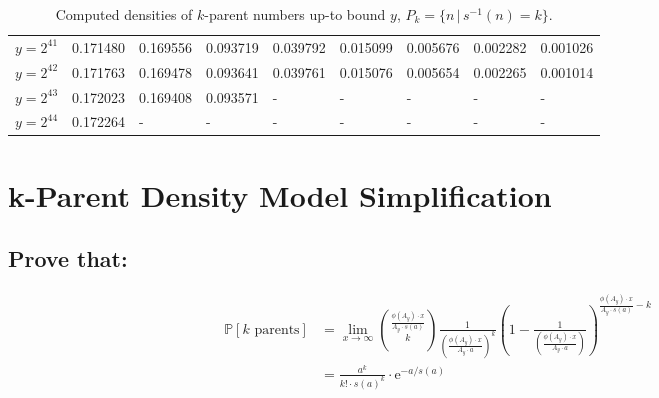\documentclass{article}
\theoremstyle{definition}
\begin{document}
\begin{table}[h!]
{\begin{tabular}{l|rrrrrrrr}
            $y = 2^{41}$             & 0.171480 & 0.169556              & 0.093719              & 0.039792              & 0.015099              & 0.005676              & 0.002282              & 0.001026              \\
            $y = 2^{42}$             & 0.171763 & 0.169478              & 0.093641              & 0.039761              & 0.015076              & 0.005654              & 0.002265              & 0.001014              \\
            $y = 2^{43}$             & 0.172023 & 0.169408              & 0.093571              & \multicolumn{1}{l}{-} & \multicolumn{1}{l}{-} & \multicolumn{1}{l}{-} & \multicolumn{1}{l}{-} & \multicolumn{1}{l}{-} \\
            $y = 2^{44}$             & 0.172264 & \multicolumn{1}{l}{-} & \multicolumn{1}{l}{-} & \multicolumn{1}{l}{-} & \multicolumn{1}{l}{-} & \multicolumn{1}{l}{-} & \multicolumn{1}{l}{-} & \multicolumn{1}{l}{-}
        \end{tabular} 
    }
    \label{tab:pomyang_all}
    \caption{Computed densities of $k$-parent numbers up-to bound $y$, $P_k = \{n \,|\, s^{-1}(n) = k\}$.}
\end{table}
\pagebreak

\section{k-Parent Density Model Simplification}
\subsection*{Prove that:}
\begin{align*}
    \mathbb{P}[k \text{ parents}] & =  \lim_{x \to \infty}{\frac{\phi(A_y) \cdot x}{A_y \cdot s(a)} \choose k } \frac{1}{\left(\frac{\phi(A_y) \cdot x}{ A_y \cdot a}\right)^k} \left(1- \frac{1}{\left(\frac{\phi(A_y) \cdot x}{ A_y \cdot a}\right)}\right)^{\frac{\phi(A_y) \cdot x}{A_y \cdot s(a)  } -k} \\
                                  & = \frac{a^{k}}{k! \cdot s(a)^k} \cdot \text{e}^{-a/s(a)}
\end{align*}
\end{document}
